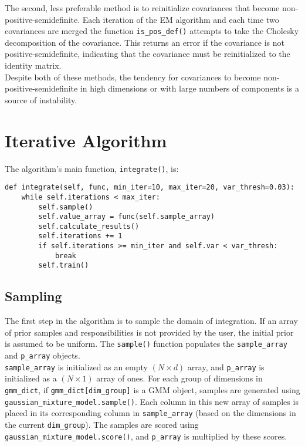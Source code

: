 \documentclass{article}
\begin{document}
The second, less preferable method is to reinitialize covariances that become
non-positive-semidefinite. Each iteration of the EM algorithm and each time two
covariances are merged the function \texttt{is\_pos\_def()} attempts to take the
Cholesky decomposition of the covariance. This returns an error if the covariance
is not positive-semidefinite, indicating that the covariance must be
reinitialized to the identity matrix. \\

Despite both of these methods, the tendency for covariances to become
non-positive-semidefinite in high dimensions or with large numbers of components
is a source of instability.

\section{Iterative Algorithm}

The algorithm's main function, \texttt{integrate()}, is:
\begin{verbatim}
def integrate(self, func, min_iter=10, max_iter=20, var_thresh=0.03):
    while self.iterations < max_iter:
        self.sample()
        self.value_array = func(self.sample_array)
        self.calculate_results()
        self.iterations += 1
        if self.iterations >= min_iter and self.var < var_thresh:
            break
        self.train()
\end{verbatim}

\subsection{Sampling}

The first step in the algorithm is to sample the domain of integration.
If an array of prior samples and responsibilities is not provided by the user,
the initial prior is assumed to be uniform. The \texttt{sample()} function
populates the \texttt{sample\_array} and \texttt{p\_array} objects. \\

\texttt{sample\_array} is initialized as an empty $(N \times d)$ array, and
\texttt{p\_array} is initialized as a $(N \times 1)$ array of ones. For each
group of dimensions in \texttt{gmm\_dict}, if \texttt{gmm\_dict[dim\_group]} is
a GMM object, samples are generated using
\\ \texttt{gaussian\_mixture\_model.sample()}.
Each column in this new array of samples is placed in its corresponding column in
\texttt{sample\_array} (based on the dimensions in the current \texttt{dim\_group}).
The samples are scored using
\\ \texttt{gaussian\_mixture\_model.score()}, and
\texttt{p\_array} is multiplied by these scores. \\
\end{document}
